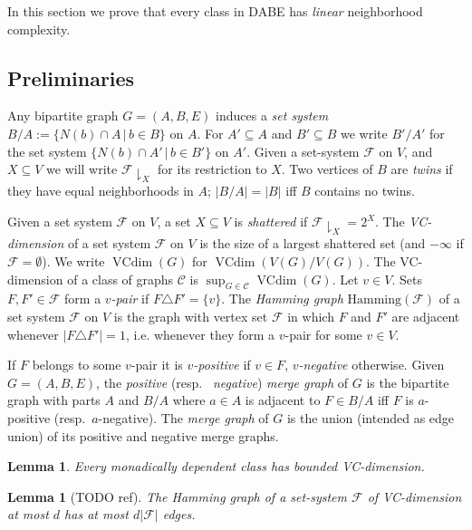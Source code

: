 \documentclass[11pt]{article}
\newtheorem{lemma}[theorem]{Lemma}
\theoremstyle{definition}
\newcommand{\CC}{{\mathscr C}}
\newcommand{\inducedSS}[2]{#1/#2}%
\newcommand{\set}[1]{\{#1\}}
\newcommand{\setof}[2]{\set{#1 \,|\, #2 }}
\newcommand{\res}[1]{{\downharpoonright}_{#1}}
\renewcommand{\cal}{\mathcal}
\DeclareMathOperator{\VCdim}{VCdim}
\newcommand{\remph}[1]{{\color{red} \emph{#1}}}
\newcommand{\hamming}{\mathrm{Hamming}}
\begin{document}
In this section we prove that every class in DABE has \emph{linear} neighborhood complexity.

\subsection{Preliminaries}

Any bipartite graph $G=(A,B,E)$ induces a \remph{set system} $\inducedSS{B}{A} := \setof{N(b)\cap A}{b\in B}$ on $A$.
For $A'\subseteq A$ and $B'\subseteq B$ we write $\inducedSS{B'}{A'}$ for the set system $\setof{N(b)\cap A'}{b\in B'}$ on $A'$. Given a set-system $\cal F$ on $V$, and $X \subseteq V$ we will write \remph{$\cal F\res X$} for its restriction to $X$.
Two vertices of $B$ are \remph{twins} if they have equal neighborhoods in $A$; $|\inducedSS{B}{A}|=|B|$ iff $B$ contains no twins.

Given a set system $\cal F$ on $V$, a set $X \subseteq V$ is \remph{shattered} if $\cal F\res X=2^X$.
The \remph{VC-dimension} of a set system $\cal F$ on $V$ is the size of a largest shattered set (and $-\infty$ if $\cal F=\emptyset$).
We write $\VCdim(G)$ for $\VCdim(\inducedSS{V(G)}{V(G)})$. The VC-dimension of a class of graphs $\CC$ is $\sup_{G \in \CC} \VCdim(G)$.
Let $v\in V$. Sets $F,F' \in \cal F$ form a \remph{$v$-pair} if $F\triangle F'=\set{v}$.
The \remph{Hamming graph} $\hamming(\cal F)$ of a set system $\cal F$ on $V$ is the graph with vertex set $\cal F$ in which $F$ and $F'$ are adjacent whenever $|F \triangle F'| = 1$, i.e. whenever they form a $v$-pair for some $v \in V$.

If $F$ belongs to some $v$-pair it is \remph{$v$-positive} if $v\in F$, \remph{$v$-negative} otherwise.
Given $G=(A,B,E)$, the \remph{positive} (resp.\ \remph{negative}) \remph{merge graph} of $G$ is the bipartite graph with parts $A$ and $\inducedSS{B}{A}$ where $a\in A$ is adjacent to $F\in \inducedSS{B}{A}$ iff $F$ is $a$-positive (resp.\ $a$-negative).
The \remph{merge graph} of $G$ is the union (intended as edge union) of its positive and negative merge graphs.

\begin{lemma}\label{lem:dep-bounded-vc}
Every monadically dependent class has bounded VC-dimension.
\end{lemma}

\begin{lemma}[TODO ref]\label{lem:VC-dim2deg}
The Hamming graph of a set-system $\cal F$ of VC-dimension at most $d$ has at most $d |\cal F|$ edges.  
\end{lemma}
\end{document}
